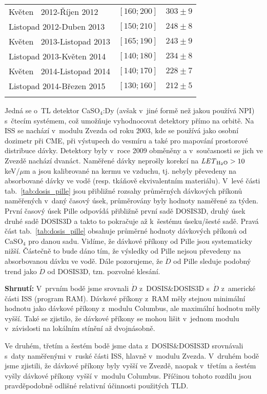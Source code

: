 \begin{enumerate}
\begin{table}[ht]
\begin{tabular}{ll|l}
		\hline
		Květen $\ $ 2012-Říjen 2012&$[160;200]$&$303\pm9$	\\
		Listopad 2012-Duben  2013&$[150;210]$&$248\pm8$	\\
		Květen $\ $ 2013-Listopad 2013&$[165;190]$&$243\pm9$	\\
		Listopad 2013-Květen  2014&$[140;180]$&$234\pm8$	\\
		Květen $\ $ 2014-Listopad 2014&$[140;170]$&$228\pm7$	\\
		Listopad 2014-Březen  2015&$[130;160]$&$212\pm5$	\\
		\mybottomrule
	  \end{tabular}
	\end{table}
	 Jedná se o~TL detektor CaSO$_4$:Dy (avšak v~jiné formě než jakou používá NPI) s~čtecím systémem, což umožňuje vyhodnocovat detektory přímo na orbitě. Na ISS se nachází v~modulu Zvezda od roku 2003, kde se používá jako osobní dozimetr při CME, při výstupech do vesmíru a také pro mapování prostorové distribuce dávky. Detektory byly v~roce 2009 obměněny a v~současnosti se jich ve Zvezdě nachází dvanáct. Naměřené dávky neprošly korekcí na $\mathit{LET}_{\text{H$_2$O}}>10$ keV/$\mu$m a jsou kalibrované na kermu ve vzduchu, tj. nebyly převedeny na absorbované dávky ve vodě (resp. tkáňově ekvivalentním materiálu). V~levé části tab.~\ref{tab:dosis_pille} jsou přibližné rozsahy průměrných dávkových příkonů naměřených v~daný časový úsek, průměrovány byly hodnoty
	 naměřené za týden. První časový úsek Pille odpovídá přibližně první sadě DOSIS3D, druhý úsek druhé sadě DOSIS3D a takto to pokračuje až k~šestému úseku/šesté sadě. Pravá část tab.~\ref{tab:dosis_pille} obsahuje průměrné hodnoty dávkových příkonů od CaSO$_4$ pro danou sadu. Vidíme, že dávkové příkony od Pille jsou systematicky nižší. Částečně to bude dáno tím, že výsledky od Pille nejsou převedeny na absorbovanou dávku ve vodě. Dále pozorujeme, že $\dot{D}$ od Pille sleduje podobný trend jako
	 $\dot{D}$ od DOSIS3D, tzn. pozvolné klesání.~\cite{pille, pille2}
 \end{enumerate}
 \textbf{Shrnutí:} V~prvním bodě jsme srovnali $\dot{D}$ z~DOSIS\&DOSIS3D s~$\dot{D}$ z~americké části ISS (program RAM). Dávkové příkony z~RAM měly stejnou minimální hodnotu jako dávkové příkony z~modulu Columbus, ale maximální hodnotu měly vyšší. Také se zjistilo, že dávkové příkony se mohou lišit v~jednom modulu v~závislosti na lokálním stínění až dvojnásobně.
 
 Ve druhém, třetím a šestém bodě jsme data z~DOSIS\&DOSIS3D srovnávali s~daty naměřenými v~ruské části ISS, hlavně v~modulu Zvezda. V~druhém bodě jsme zjistili, že dávkové příkony byly vyšší ve Zvezdě, naopak v~třetím a šestém vyšly dávkové příkony vyšší v~modulu Columbus. Příčinou tohoto rozdílu jsou pravděpodobně odlišné relativní účinnosti použitých TLD.

